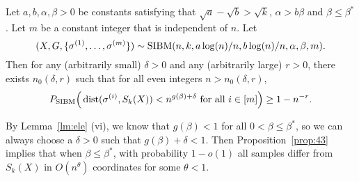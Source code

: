 \documentclass{article}
\begin{document}
\begin{proposition} \label{prop:43}
Let $a,b,\alpha,\beta> 0$ be constants satisfying that $\sqrt{a}-\sqrt{b} > \sqrt{k}$, $\alpha>b\beta$ and $\beta\le\beta^\ast$. Let $m$ be a constant integer that is independent of $n$.
Let 
$$
(X,G,\{\sigma^{(1)},\dots,\sigma^{(m)}\})\sim \operatorname{SIBM}(n,k, a\log(n)/n, b\log(n)/n,\alpha,\beta, m) .
$$
Then for any (arbitrarily small) $\delta>0$ and any (arbitrarily large) $r>0$, there exists $n_0(\delta, r)$ such that for all even integers $n>n_0(\delta, r)$,
$$
P_{\operatorname{SIBM}} \Big(\operatorname{dist}(\sigma^{(i)},S_k(X))<n^{g(\beta)+\delta}
\text{~for all~} i\in[m] \Big) \ge 1- n^{-r} .
$$
\end{proposition}

By Lemma~\ref{lm:ele} (vi), we know that $g(\beta)<1$ for all $0<\beta\le\beta^\ast$, so we can always choose a $\delta>0$ such that $g(\beta)+\delta<1$.
Then Proposition~\ref{prop:43} implies that when $\beta\le\beta^\ast$,
with probability $1-o(1)$ all samples differ from $S_k(X)$ in $O(n^\theta)$ coordinates for some $\theta<1$.
\end{document}
